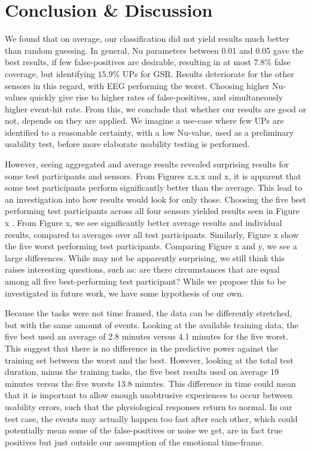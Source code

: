 \section{Conclusion \& Discussion}
We found that on average, our classification did not yield results much better than random guessing. In general, Nu
parameters between 0.01 and 0.05 gave the best results, if few false-positives are desirable, resulting in at most
$7.8\%$ false coverage, but identifying $15.9\%$ UPs for GSR. Results deteriorate for the other sensors in this regard,
with EEG performing the worst. Choosing higher Nu-values quickly give rise to higher rates of false-positives, and
simultaneously higher event-hit rate. From this, we conclude that whether our results are good or not, depends on they
are applied. We imagine a use-case where few UPs are identified to a reasonable certainty, with a low Nu-value, used as
a preliminary usability test, before more elaborate usability testing is performed.

However, seeing aggregated and average results revealed surprising results for some test participants and sensors. From
Figures x.x.x and x, it is apparent that some test participants perform significantly better than the average. This lead
to an investigation into how results would look for only those. Choosing the five best performing test participants
across all four sensors yielded results seen in Figure x . From Figure x, we see significantly better
average results and individual results, compared to averages over all test participants. Similarly, Figure x show the
five worst performing test participants. Comparing Figure x and y, we see a large differences. While may not be
apparently surprising, we still think this raises interesting questions, such as: are there circumstances that are equal among all
five best-performing test participant? While we propose this to be investigated in future work, we have some hypothesis
of our own.

Because the tasks were not time framed, the data can be differently stretched, but with the same amount of
events. Looking at the available training data, the five best used an average of 2.8 minutes versus 4.1 minutes for the
five worst. This suggest that there is no difference in the predictive power against the training set between the worst
and the best. However, looking at the total test duration, minus the training tasks, the five best results used on
average 19 minutes versus the five worsts 13.8 minutes. This difference in time could mean that it is important to allow
enough unobtrusive experiences to occur between usability errors, such that the physiological responses return to
normal. In our test case, the events may actually happen too fast after each other, which could potentially mean some of
the false-positives or noise we get, are in fact true positives but just outside our assumption of the emotional
time-frame.

